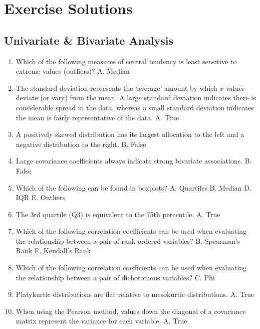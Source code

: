 \documentclass[]{book}
\begin{document}
\hypertarget{exercise-solutions}{%
\section{Exercise Solutions}\label{exercise-solutions}}

\hypertarget{univariate-bivariate-analysis}{%
\subsection{Univariate \& Bivariate Analysis}\label{univariate-bivariate-analysis}}

\begin{enumerate}
\def\labelenumi{\arabic{enumi}.}
\item
  Which of the following measures of central tendency is least sensitive to extreme values (outliers)?
  A. Median
\item
  The standard deviation represents the `average' amount by which \(x\) values deviate (or vary) from the mean. A large standard deviation indicates there is considerable spread in the data, whereas a small standard deviation indicates the mean is fairly representative of the data.
  A. True
\item
  A positively skewed distribution has its largest allocation to the left and a negative distribution to the right.
  B. False
\item
  Large covariance coefficients always indicate strong bivariate associations.
  B. False
\item
  Which of the following can be found in boxplots?
  A. Quartiles
  B. Median
  D. IQR
  E. Outliers
\item
  The 3rd quartile (Q3) is equivalent to the 75th percentile.
  A. True
\item
  Which of the following correlation coefficients can be used when evaluating the relationship between a pair of rank-ordered variables?
  B. Spearman's Rank
  E. Kendall's Rank
\item
  Which of the following correlation coefficients can be used when evaluating the relationship between a pair of dichotomous variables?
  C. Phi
\item
  Platykurtic distributions are flat relative to mesokurtic distributions.
  A. True
\item
  When using the Pearson method, values down the diagonal of a covariance matrix represent the variance for each variable.
  A. True
\end{enumerate}
\end{document}
